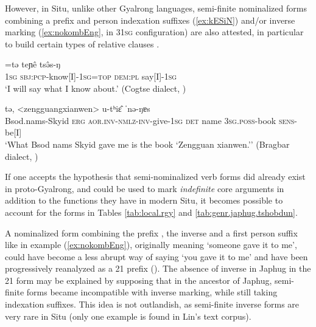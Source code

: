 However, in Situ, unlike other Gyalrong languages, semi-finite nominalized forms combining a prefix  and person indexation suffixes (\ref{ex:kESiN}) and/or inverse marking (\ref{ex:nokombEng}, in 3\fl{}\textsc{1sg} configuration) are also attested, in particular to build certain types of relative clauses \citep{jacksonlin07}.
 
\begin{exe}
\ex \label{ex:kESiN}
 \gll [ŋa kə-ʃî-ŋ]=tə teɲê tsə̂s-ŋ \\
\textsc{1sg} \textsc{sbj}:\textsc{pcp}-know[I]-\textsc{1sg}=\textsc{top} \textsc{dem}:\textsc{pl} say[I]-\textsc{1sg} \\
\glt `I will say what I know about.' (Cogtse dialect, \citealt[72]{linyj16cogtse})
\end{exe}

\begin{exe}
\ex \label{ex:nokombEng}
  tə, <zengguangxianwen> u-tʰiɛ̂ ˈnə-ŋɐs \\
Bsod.nams-Skyid \textsc{erg} \textsc{aor}.\textsc{inv}-\textsc{nmlz}-\textsc{inv}-give-\textsc{1sg} \textsc{det} name \textsc{3sg}.\textsc{poss}-book \textsc{sens}-be[I] \\
\glt `What Bsod nams Skyid gave me is the book `Zengguan xianwen.'' (Bragbar dialect, \citealt{zhangshuya20these})
\end{exe}


If one accepts the hypothesis that semi-nominalized verb forms did already exist in proto-Gyalrong, and could be used to mark \textit{indefinite} core arguments in addition to the functions they have in modern Situ, it becomes possible to account for the forms in Tables \ref{tab:local.rgy} and \ref{tab:genr.japhug.tshobdun}. 

A nominalized form combining the prefix , the inverse and a first person suffix like  in example (\ref{ex:nokombEng}), originally meaning `someone gave it to me', could have become a less abrupt way of saying `you gave it to me' and have been progressively reanalyzed as a  2\fl{}1 prefix (\citealt{jacques18generic, delancey18sociopragmatic}). The absence of inverse in Japhug in the 2\fl{}1 form may be explained by supposing that in the ancestor of Japhug, semi-finite forms became incompatible with inverse marking, while still taking indexation suffixes. This idea is not outlandish, as semi-finite inverse forms are very rare in Situ (only one example is found in Lin's \citeyear{linyj16cogtse} text corpus).

